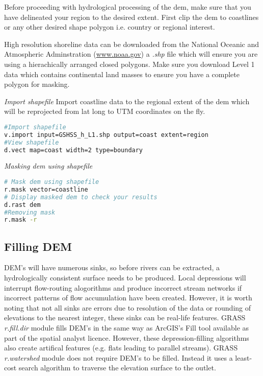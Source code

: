Before proceeding with hydrological processing of the dem, make sure that you have delineated your region to the desired extent. First clip the dem to coastlines or any other desired shape polygon i.e. country or regional interest. 

High resolution shoreline data can be downloaded from the National Oceanic and Atmospheric Adminstration (\url{www.noaa.gov}) a \textit{.shp} file which will ensure you are using a hierachically arranged closed polygons. Make sure you download Level 1 data which contains continental land masses to ensure you have a complete polygon for masking.

\textit{Import shapefile} \newline
Import coastline data to the regional extent of the dem which will be reprojected from lat long to UTM coordinates on the fly.

\begin{lstlisting}[language=bash]
#Import shapefile
v.import input=GSHSS_h_L1.shp output=coast extent=region
#View shapefile 
d.vect map=coast width=2 type=boundary
\end{lstlisting}

\textit{Masking dem using shapefile}

\begin{lstlisting}[language=bash]
# Mask dem using shapefile
r.mask vector=coastline
# Display masked dem to check your results 
d.rast dem
#Removing mask
r.mask -r
\end{lstlisting}

\subsection{Filling DEM}

DEM's will have numerous sinks, so before rivers can be extracted, a hydrologically consistent surface needs to be produced. Local depressions will interrupt flow-routing alogorithms and produce incorrect stream networks if incorrect patterns of flow accumulation have been created. However, it is worth noting that not all sinks are errors due to resolution of the data or rounding of elevations to the nearest integer, these sinks can be real-life features. GRASS \textit{r.fill.dir} module fills DEM's in the same way as ArcGIS's Fill tool available as part of the spatial analyst licence. However, these depression-filling algorithms also create artifical features (e.g. flats leading to parallel streams). GRASS \textit{r.watershed} module does not require DEM's to be filled. Instead it uses a least-cost search algorithm to traverse the elevation surface to the outlet.

